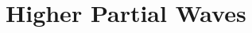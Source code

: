 \documentclass[Dissertation.tex]{subfiles}
\begin{document}
\clearpage
\pagebreak
\newpage

\chapter{Higher Partial Waves}
\label{chp:HigherWaves}



%
%
\end{document}
